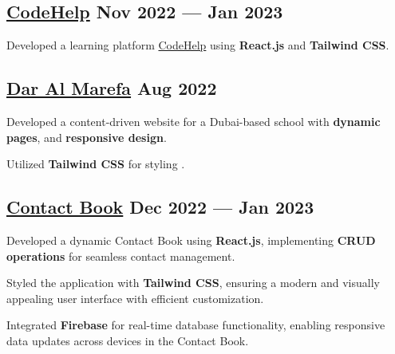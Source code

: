 \subsection{{\href{https://www.thecodehelp.in}{CodeHelp} \hfill Nov 2022 --- Jan 2023}}
\begin{zitemize}
\item Developed a learning platform \href{https://www.thecodehelp.in}{CodeHelp} using \textbf{React.js} and \textbf{Tailwind CSS}.
\end{zitemize}

\subsection{{\href{https://www.daralmarefa.ae}{Dar Al Marefa} \hfill Aug 2022}}
\begin{zitemize}
\item Developed a content-driven website for a Dubai-based school with \textbf{dynamic pages}, and \textbf{responsive design}.
\item Utilized \textbf{Tailwind CSS} for styling .
\end{zitemize}

\subsection{{\href{https://contact-app-firebase-inky.vercel.app/}{Contact Book} \hfill Dec 2022 --- Jan 2023}}
\begin{zitemize}
\item Developed a dynamic Contact Book using \textbf{React.js}, implementing \textbf{CRUD operations} for seamless contact management.
\item Styled the application with \textbf{Tailwind CSS}, ensuring a modern and visually appealing user interface with efficient customization.
\item Integrated \textbf{Firebase} for real-time database functionality, enabling responsive data updates across devices in the Contact Book.\end{zitemize}

